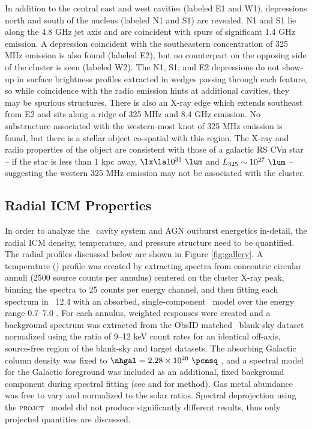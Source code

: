 \documentclass[11pt, preprint]{aastex}
\begin{document}
In addition to the central east and west cavities (labeled E1 and W1),
depressions north and south of the nucleus (labeled N1 and S1) are
revealed. N1 and S1 lie along the 4.8 GHz jet axis and are coincident
with spurs of significant 1.4 GHz emission. A depression coincident
with the southeastern concentration of 325 MHz emission is also found
(labeled E2), but no counterpart on the opposing side of the cluster
is seen (labeled W2). The N1, S1, and E2 depressions do not show-up in
surface brightness profiles extracted in wedges passing through each
feature, so while coincidence with the radio emission hints at
additional cavities, they may be spurious structures. There is also an
X-ray edge which extends southeast from E2 and sits along a ridge of
325 MHz and 8.4 GHz emission. No substructure associated with the
western-most knot of 325 MHz emission is found, but there is a stellar
object co-spatial with this region.  The X-ray and radio properties of
the object are consistent with those of a galactic RS CVn star
\citep{1993RPPh...56.1145S} -- if the star is less than 1 kpc away,
$\lx \la 10^{31} ~\lum$ and $L_{325} \sim 10^{27} ~\lum$ -- suggesting
the western 325 MHz emission may not be associated with the cluster.

\subsection{Radial ICM Properties}
\label{sec:icm}

In order to analyze the \rbs\ cavity system and AGN outburst
energetics in-detail, the radial ICM density, temperature, and
pressure structure need to be quantified. The radial profiles
discussed below are shown in Figure \ref{fig:gallery}. A temperature
(\tx) profile was created by extracting spectra from concentric
circular annuli (2500 source counts per annulus) centered on the
cluster X-ray peak, binning the spectra to 25 counts per energy
channel, and then fitting each spectrum in \xspec\ 12.4 \citep{xspec}
with an absorbed, single-component \mekal\ model \citep{mekal1} over
the energy range 0.7--7.0 \keV. For each annulus, weighted responses
were created and a background spectrum was extracted from the ObsID
matched \caldb\ blank-sky dataset normalized using the ratio of 9--12
keV count rates for an identical off-axis, source-free region of the
blank-sky and target datasets. The absorbing Galactic column density
was fixed to $\nhgal = 2.28 \times 10^{20} ~\pcmsq$ \citep{lab}, and a
spectral model for the Galactic foreground was included as an
additional, fixed background component during spectral fitting (see
\citealt{2005ApJ...628..655V} and \citealt{xrayband} for method). Gas
metal abundance was free to vary and normalized to the \citet{ag89}
solar ratios. Spectral deprojection using the {\textsc{projct}}
\xspec\ model did not produce significantly different results, thus
only projected quantities are discussed.
\end{document}
